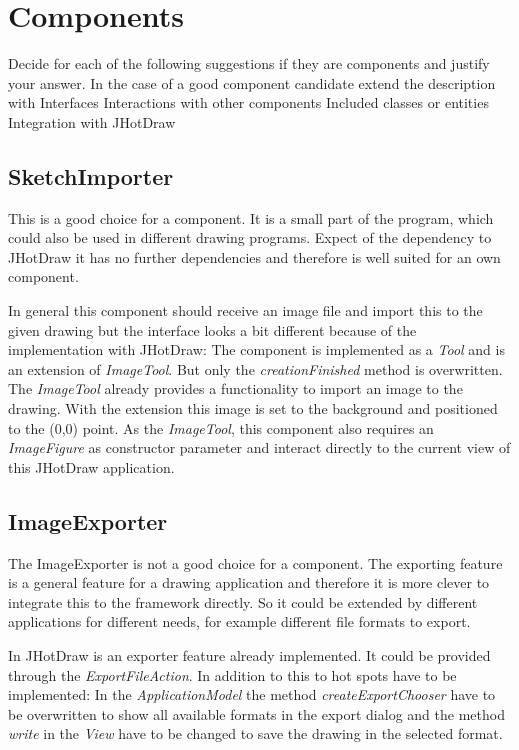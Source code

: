 \section{Components}

Decide for each of the following suggestions if they are components and justify your
answer. In the case of a good component candidate extend the description with
Interfaces
Interactions with other components
Included classes or entities
Integration with JHotDraw

\subsection{SketchImporter}
This is a good choice for a component. It is a small part of the program, which could also be used in different drawing programs. Expect of the dependency to JHotDraw it has no further dependencies and therefore is well suited for an own component.

In general this component should receive an image file and import this to the given drawing but the interface looks a bit different because of the implementation with JHotDraw: The component is implemented as a \textit{Tool} and is an extension of \textit{ImageTool}. But only the \textit{creationFinished} method is overwritten. The \textit{ImageTool} already provides a functionality to import an image to the drawing. With the extension this image is set to the background and positioned to the (0,0) point. As the \textit{ImageTool}, this component also requires an \textit{ImageFigure} as constructor parameter and interact directly to the current view of this JHotDraw application.

\subsection{ImageExporter}
The ImageExporter is not a good choice for a component. The exporting feature is a general feature for a drawing application and therefore it is more clever to integrate this to the framework directly. So it could be extended by different applications for different needs, for example different file formats to export.

In JHotDraw is an exporter feature already implemented. It could be provided through the \textit{ExportFileAction}. In addition to this to hot spots have to be implemented: In the \textit{ApplicationModel} the method \textit{createExportChooser} have to be overwritten to show all available formats in the export dialog and the method \textit{write} in the \textit{View} have to be changed to save the drawing in the selected format.